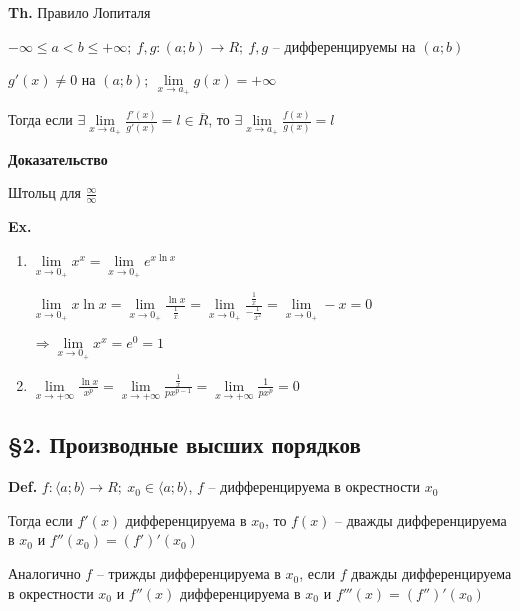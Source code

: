 \documentclass[14pt, letter paper]{article}
\newcommand{\q}[1]{\langle #1 \rangle}
\begin{document}
\vspace{5mm}

\textbf{Th.} Правило Лопиталя

$- \infty \leq a < b \leq + \infty;\ f, g : (a; b) \rightarrow R;\ f, g$ -- дифференцируемы на $(a; b)$

$g'(x) \neq 0$ на $(a; b);\ \lim\limits_{x \rightarrow a_+} g(x) = + \infty$

Тогда если $\exists \lim\limits_{x \rightarrow a_+} \frac{f'(x)}{g'(x)} = l \in \overline{R}$, то $\exists \lim\limits_{x \rightarrow a_+} \frac{f(x)}{g(x)} = l$

\begin{center}
    \textbf{Доказательство}
\end{center}

Штольц для $\frac{\infty}{\infty}$

\vspace{5mm}

\textbf{Ex.} \begin{enumerate}
    \item $\lim\limits_{x \rightarrow 0_+} x^x = \lim\limits_{x \rightarrow 0_+} e^{x\ln{x}}$
    
    $\lim\limits_{x \rightarrow 0_+} x\ln{x} = \lim\limits_{x \rightarrow 0_+} \frac{\ln{x}}{\frac{1}{x}} = \lim\limits_{x \rightarrow 0_+} \frac{\frac{1}{x}}{-\frac{1}{x^2}} = \lim\limits_{x \rightarrow 0_+} -x = 0$

    $\Rightarrow \lim\limits_{x \rightarrow 0_+} x^x = e^0 = 1$

    \item $\lim\limits_{x \rightarrow + \infty} \frac{\ln{x}}{x^p} = \lim\limits_{x \rightarrow + \infty} \frac{\frac{1}{x}}{px^{p - 1}} = \lim\limits_{x \rightarrow + \infty} \frac{1}{px^p} = 0$ 
\end{enumerate}

\begin{center}
    \subsection*{\S 2. Производные высших порядков}
\end{center}

\textbf{Def.} $f : \q{a; b} \rightarrow R;\ x_0 \in \q{a; b}$, $f$ -- дифференцируема в окрестности $x_0$

Тогда если $f'(x)$ дифференцируема в $x_0$, то $f(x)$ -- дважды дифференцируема в $x_0$ и $f''(x_0) = (f')'(x_0)$

Аналогично $f$ -- трижды дифференцируема в $x_0$, если $f$ дважды дифференцируема в окрестности $x_0$ и $f''(x)$ дифференцируема в $x_0$ и $f'''(x) = (f'')'(x_0)$
\end{document}
